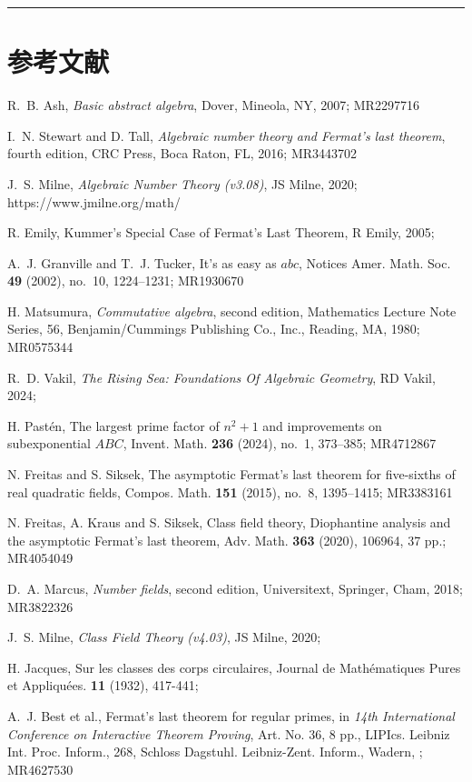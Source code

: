 \documentclass{article}
\begin{document}
\newpage
\hrule
\part{参考文献}

\begin{thebibliography}{99}

R.~B. Ash, {\it Basic abstract algebra}, Dover, Mineola, NY, 2007; MR2297716

I.~N. Stewart and D. Tall, {\it Algebraic number theory and Fermat's last theorem}, fourth edition, 
CRC Press, Boca Raton, FL, 2016; MR3443702

J.~S. Milne, {\it Algebraic Number Theory (v3.08)}, JS Milne, 2020; https://www.jmilne.org/math/

R. Emily, Kummer's Special Case of Fermat's Last Theorem, R Emily, 2005;

A.~J. Granville and T.~J. Tucker, It's as easy as $abc$, Notices Amer. Math. Soc. {\bf 49} (2002), no.~10, 1224--1231; MR1930670

H. Matsumura, {\it Commutative algebra}, second edition, 
Mathematics Lecture Note Series, 56, Benjamin/Cummings Publishing Co., Inc., Reading, MA, 1980; MR0575344

R.~D. Vakil, {\it The Rising Sea: Foundations Of Algebraic Geometry}, RD Vakil, 2024;

H. Past\'en, The largest prime factor of $n^2+1$ and improvements on subexponential $ABC$, Invent. Math. {\bf 236} (2024), no.~1, 373--385; MR4712867

N. Freitas and S. Siksek, The asymptotic Fermat's last theorem for five-sixths of real quadratic fields, Compos. Math. {\bf 151} (2015), no.~8, 1395--1415; MR3383161

N. Freitas, A. Kraus and S. Siksek, Class field theory, Diophantine analysis and the asymptotic Fermat's last theorem, Adv. Math. {\bf 363} (2020), 106964, 37 pp.; MR4054049

D.~A. Marcus, {\it Number fields}, second edition, 
Universitext, Springer, Cham, 2018; MR3822326

J.~S. Milne, {\it Class Field Theory (v4.03)}, JS Milne, 2020;

H. Jacques, Sur les classes des corps circulaires, Journal de Mathématiques Pures et Appliquées. \textbf{11} (1932), 417-441;

A.~J. Best et al., Fermat's last theorem for regular primes, in {\it 14th International Conference on Interactive Theorem Proving}, Art. No. 36, 8 pp., LIPIcs. Leibniz Int. Proc. Inform., 268, Schloss Dagstuhl. Leibniz-Zent. Inform., Wadern, ; MR4627530

\end{thebibliography}
\end{document}
